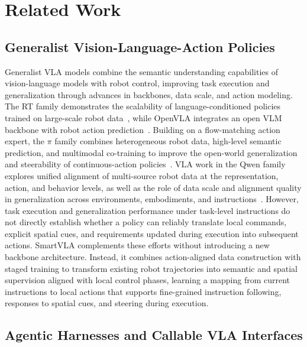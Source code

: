 \hypertarget{related-work}{%
\section{Related Work}\label{related-work}}

\hypertarget{generalist-vision-language-action-policies}{%
\subsection{Generalist Vision-Language-Action
Policies}\label{generalist-vision-language-action-policies}}

Generalist VLA models combine the semantic understanding capabilities of vision-language models with
robot control, improving task execution and generalization through advances in backbones, data
scale, and action modeling. The RT family demonstrates the scalability of language-conditioned
policies trained on large-scale robot data~\citep{brohan2022rt,brohan2023rt,openx2023embodiment},
while OpenVLA integrates an open VLM backbone with robot action
prediction~\citep{kim2024openvla,kim2025fine}. Building on a flow-matching action expert, the $\pi$
family combines heterogeneous robot data, high-level semantic prediction, and multimodal co-training
to improve the open-world generalization and steerability of continuous-action
policies~\citep{black2024pi,intelligence2025pi,intelligence2025pi06,intelligence2026pi07}. VLA work
in the Qwen family explores unified alignment of multi-source robot data at the representation,
action, and behavior levels, as well as the role of data scale and alignment quality in
generalization across environments, embodiments, and
instructions~\citep{wang2026qwenvla,yuan2026qwenrobotmanip}. However, task execution and
generalization performance under task-level instructions do not directly establish whether a policy
can reliably translate local commands, explicit spatial cues, and requirements updated during
execution into subsequent actions. SmartVLA complements these efforts without introducing a new
backbone architecture. Instead, it combines action-aligned data construction with staged training to
transform existing robot trajectories into semantic and spatial supervision aligned with local
control phases, learning a mapping from current instructions to local actions that supports
fine-grained instruction following, responses to spatial cues, and steering during execution.

\hypertarget{agentic-harnesses-and-callable-vla-interfaces}{%
\subsection{Agentic Harnesses and Callable VLA
Interfaces}\label{agentic-harnesses-and-callable-vla-interfaces}}

